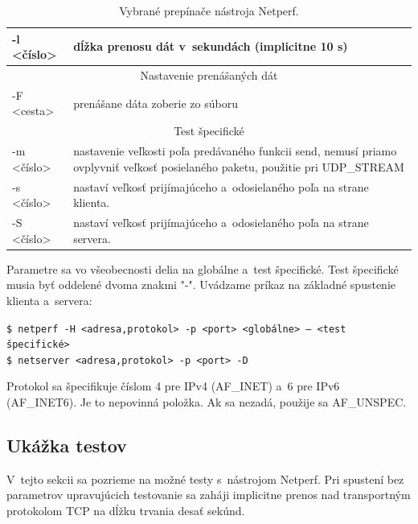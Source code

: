 \begin{table}[H]
\begin{center}
\begin{tabular}{|l|p{11cm}|}
                    \hline
                    -l \textless číslo\textgreater &
                        dĺžka prenosu dát v~sekundách (implicitne 10 s)\\
                    \hline
                    \multicolumn{2}{|c|}{Nastavenie prenášaných dát} \\
                    \hline
                    -F \textless cesta\textgreater & 
                        prenášane dáta zoberie zo súboru \\
                    \hline
                    \multicolumn{2}{|c|}{Test špecifické} \\
                    \hline
                    -m \textless číslo\textgreater &
                        nastavenie veľkosti poľa predávaného
                        funkcii send, nemusí priamo ovplyvniť veľkosť
                        posielaného paketu, použitie pri UDP\_STREAM\\
                    -s \textless číslo\textgreater  & 
                        nastaví veľkosť prijímajúceho
                        a~odosielaného poľa na strane klienta.\\
                    -S \textless číslo\textgreater &
                        nastaví veľkosť prijímajúceho
                        a~odosielaného poľa na strane servera.\\
                     \hline
                \end{tabular}
                \caption{Vybrané prepínače nástroja Netperf.} 
                \label{tab_netperf_parametre}
            \end{center}
        \end{table}

        \noindent Parametre sa vo všeobecnosti delia na globálne a~test špecifické.
        Test špecifické musia byť oddelené dvoma znakmi "-". 
        Uvádzame príkaz na základné spustenie klienta a~servera:
        \begin{flushleft}
            \texttt{\$ netperf -H <adresa,protokol> -p <port> <globálne> -- <test špecifické>} \\
            \texttt{\$ netserver <adresa,protokol> -p <port> -D}
        \end{flushleft}
        \noindent Protokol sa špecifikuje číslom 4 pre IPv4 (AF\_INET) a~6 pre 
        IPv6 (AF\_INET6). Je to nepovinná položka. Ak sa nezadá,
        použije sa AF\_UNSPEC.

        \subsection{Ukážka testov} \label{netperf_testy}
        V~tejto sekcii sa pozrieme na možné testy s~nástrojom Netperf.
        Pri spustení bez parametrov upravujúcich testovanie sa zaháji
        implicitne prenos nad transportným protokolom TCP na dĺžku trvania
        desať sekúnd. 

